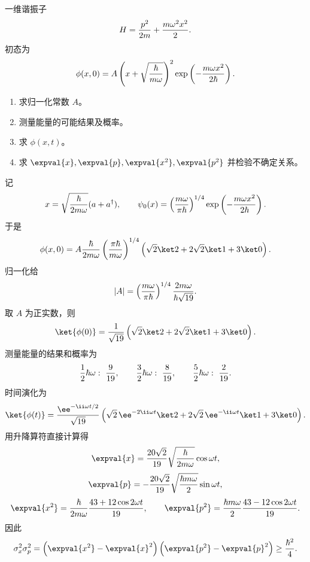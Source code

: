 
\begin{question}
一维谐振子
\[
  H={p^2\over2m}+{m\omega^2x^2\over2}.
\]
初态为
\[
  \phi(x,0)=A\left(x+\sqrt{\hbar\over m\omega}\right)^2
  \exp\left(-{m\omega x^2\over2\hbar}\right).
\]
\begin{enumerate}
  \item 求归一化常数 $A$。
  \item 测量能量的可能结果及概率。
  \item 求 $\phi(x,t)$。
  \item 求 $\expval{x},\expval{p},\expval{x^2},\expval{p^2}$ 并检验不确定关系。
\end{enumerate}
\begin{solution}
记
\[
  x=\sqrt{\hbar\over2m\omega}(a+a^\dagger),\qquad
  \psi_0(x)=\left({m\omega\over\pi\hbar}\right)^{1/4}
  \exp\left(-{m\omega x^2\over2\hbar}\right).
\]
于是
\[
  \phi(x,0)=A{\hbar\over2m\omega}\left({\pi\hbar\over m\omega}\right)^{1/4}
  \left(\sqrt2\ket2+2\sqrt2\ket1+3\ket0\right).
\]
归一化给
\[
  |A|=\left({m\omega\over\pi\hbar}\right)^{1/4}{2m\omega\over\hbar\sqrt{19}}.
\]
取 $A$ 为正实数，则
\[
  \ket{\phi(0)}={1\over\sqrt{19}}\left(\sqrt2\ket2+2\sqrt2\ket1+3\ket0\right).
\]
测量能量的结果和概率为
\[
  {1\over2}\hbar\omega:\ {9\over19},\qquad
  {3\over2}\hbar\omega:\ {8\over19},\qquad
  {5\over2}\hbar\omega:\ {2\over19}.
\]
时间演化为
\[
  \ket{\phi(t)}={\ee^{-\ii\omega t/2}\over\sqrt{19}}
  \left(\sqrt2\,\ee^{-2\ii\omega t}\ket2
  +2\sqrt2\,\ee^{-\ii\omega t}\ket1+3\ket0\right).
\]
用升降算符直接计算得
\[
  \expval{x}={20\sqrt2\over19}\sqrt{\hbar\over2m\omega}\cos\omega t,
\]
\[
  \expval{p}=-{20\sqrt2\over19}\sqrt{\hbar m\omega\over2}\sin\omega t,
\]
\[
  \expval{x^2}={\hbar\over2m\omega}{43+12\cos2\omega t\over19},
  \qquad
  \expval{p^2}={\hbar m\omega\over2}{43-12\cos2\omega t\over19}.
\]
因此
\[
  \sigma_x^2\sigma_p^2=\left(\expval{x^2}-\expval{x}^2\right)
  \left(\expval{p^2}-\expval{p}^2\right)\ge{\hbar^2\over4}.
\]
\end{solution}
\end{question}


